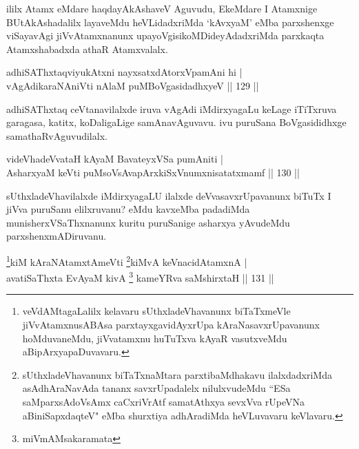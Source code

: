 \begin{artha}
ililx Atamx eMdare haqdayAkAshaveV Aguvudu, EkeMdare I Atamxnige BUtAkAshadalilx layaveMdu heVLidadxriMda `kAvxyaM' eMba parxshenxge viSayavAgi jiVvAtamxnanunx upayoVgisikoMDideyAdadxriMda parxkaqta Atamxshabadxda athaR Atamxvalalx.
\end{artha}


\begin{shl}
adhiSAThxtaqviyukAtxni nayxsatxdAtorxVpamAni hi |\\
vAgAdikaraNAniVti nAlaM puMBoVgasidadhxyeV \hfill || 129 ||
\end{shl}

\begin{artha}
adhiSAThxtaq ceVtanavilalxde iruva vAgAdi iMdirxyagaLu keLage iTiTxruva garagasa, katitx, koDaligaLige samAnavAguvavu.  ivu puruSana BoVgasididhxge samathaRvAguvudilalx.
\end{artha}


\begin{shl}
videVhadeVvataH kAyaM BavateyxVSa pumAniti |\\
AsharxyaM keVti puMsoV\s sAvapArxkiSxVnumxnisatatxmamf \hfill || 130 ||
\end{shl}

\begin{artha}
sUthxladeVhavilalxde iMdirxyagaLU ilalxde deVvasavxrUpavanunx biTuTx I jiVva puruSanu elilxruvanu? eMdu kavxeMba padadiMda munisherxVSaThxnanunx kuritu puruSanige asharxya yAvudeMdu parxshenxmADiruvanu.
\end{artha}





 








\begin{shl}
\footnote{veVdAMtagaLalilx kelavaru sUthxladeVhavanunx biTaTxmeVle jiVvAtamxnusABAsa parxtayxgavidAyxrUpa kAraNasavxrUpavanunx hoMduvaneMdu, jiVvatamxnu huTuTxva kAyaR vasutxveMdu aBipArxyapaDuvavaru.}kiM kAraNAtamxtAmeVti \footnote{sUthxladeVhavanunx biTaTxnaMtara parxtibaMdhakavu ilalxdadxriMda asAdhAraNavAda tananx savxrUpadalelx nilulxvudeMdu ``ESa saMparxsAdoVsAmx caCxriVrAtf samatAthxya sevxVva rUpeVNa aBiniSapxdaqteV" eMba shurxtiya adhAradiMda heVLuvavaru keVlavaru.}kiMvA keVnacidAtamxnA |\\
avatiSaThxta EvAyaM kivA \footnote{miVmAMsakaramata} kameYRva saMshirxtaH \hfill || 131 ||
\end{shl}

